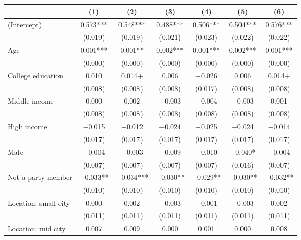 \documentclass[
  letterpaper,
  DIV=11,
  numbers=noendperiod]{scrartcl}
\begin{document}
\begin{table}
{\centering
\begin{tabular}[t]{lcccccc}
\toprule
  & (1) & (2) & (3) & (4) & (5) & (6)\\
\midrule
(Intercept) & \num{0.573}*** & \num{0.548}*** & \num{0.488}*** & \num{0.506}*** & \num{0.504}*** & \num{0.576}***\\
 & (\num{0.019}) & (\num{0.019}) & (\num{0.021}) & (\num{0.023}) & (\num{0.022}) & (\num{0.022})\\
Age & \num{0.001}*** & \num{0.001}** & \num{0.002}*** & \num{0.001}*** & \num{0.002}*** & \num{0.001}***\\
 & (\num{0.000}) & (\num{0.000}) & (\num{0.000}) & (\num{0.000}) & (\num{0.000}) & (\num{0.000})\\
College education & \num{0.010} & \num{0.014}+ & \num{0.006} & \num{-0.026} & \num{0.006} & \num{0.014}+\\
 & (\num{0.008}) & (\num{0.008}) & (\num{0.008}) & (\num{0.017}) & (\num{0.008}) & (\num{0.008})\\
Middle income & \num{0.000} & \num{0.002} & \num{-0.003} & \num{-0.004} & \num{-0.003} & \num{0.001}\\
 & (\num{0.008}) & (\num{0.008}) & (\num{0.008}) & (\num{0.008}) & (\num{0.008}) & (\num{0.008})\\
High income & \num{-0.015} & \num{-0.012} & \num{-0.024} & \num{-0.025} & \num{-0.024} & \num{-0.014}\\
 & (\num{0.017}) & (\num{0.017}) & (\num{0.017}) & (\num{0.017}) & (\num{0.017}) & (\num{0.017})\\
Male & \num{-0.004} & \num{-0.003} & \num{-0.009} & \num{-0.010} & \num{-0.040}* & \num{-0.004}\\
 & (\num{0.007}) & (\num{0.007}) & (\num{0.007}) & (\num{0.007}) & (\num{0.016}) & (\num{0.007})\\
Not a party member & \num{-0.033}** & \num{-0.034}*** & \num{-0.030}** & \num{-0.029}** & \num{-0.030}** & \num{-0.032}**\\
 & (\num{0.010}) & (\num{0.010}) & (\num{0.010}) & (\num{0.010}) & (\num{0.010}) & (\num{0.010})\\
Location: small city & \num{0.000} & \num{0.002} & \num{-0.003} & \num{-0.001} & \num{-0.003} & \num{0.002}\\
 & (\num{0.011}) & (\num{0.011}) & (\num{0.011}) & (\num{0.011}) & (\num{0.011}) & (\num{0.011})\\
Location: mid city & \num{0.007} & \num{0.009} & \num{0.000} & \num{0.001} & \num{0.000} & \num{0.008}\\

\end{tabular}}
\end{table}
\end{document}
